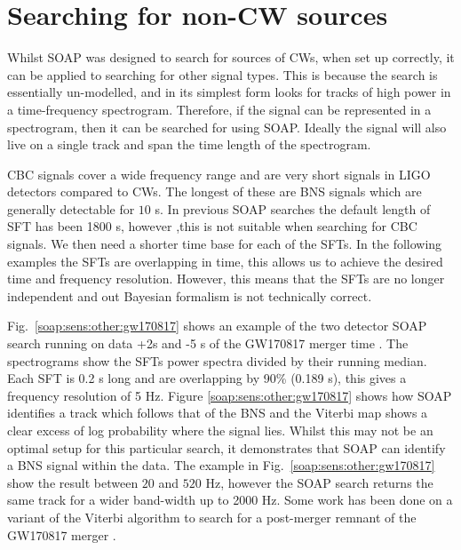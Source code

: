 \section{\label{soap:sens:other} Searching for non-CW sources}

Whilst SOAP was designed to search for sources of \glspl{CW}, when set up correctly, it can be applied to searching for other signal types.
This is because the search is essentially un-modelled, and in its simplest form looks for tracks of high power in a time-frequency spectrogram.
Therefore, if the signal can be represented in a spectrogram, then it can be
searched for using SOAP. 
Ideally the signal will also live on a single track and span the time length of the spectrogram. 

CBC signals cover a wide frequency range and are very short signals in \gls{LIGO} detectors compared to \glspl{CW}. 
The longest of these are \gls{BNS} signals which are generally detectable for $\mathcal{10}$
s. 
In previous SOAP searches the default length of \gls{SFT} has been 1800 s, however ,this is not suitable when searching for \gls{CBC} signals.
We then need a shorter time base for each of the \glspl{SFT}.
In the following examples the \glspl{SFT} are overlapping in time, this allows us to achieve the desired time and frequency resolution.
However, this means that the \glspl{SFT} are no longer independent and out Bayesian formalism is not technically correct.

Fig.~\ref{soap:sens:other:gw170817} shows an example of the two detector SOAP search running on data +2s and -5 s of the GW170817 merger time \citep{abbott2017GW170817Observation}. 
The spectrograms show the \glspl{SFT} power spectra divided by their
running median.
Each \gls{SFT} is 0.2 s long and are overlapping by 90\% (0.189 s), this gives a frequency resolution of 5 Hz. 
Figure \ref{soap:sens:other:gw170817} shows how SOAP identifies a track which
follows that of the \gls{BNS} and the Viterbi map shows a clear excess of log probability where the signal lies.
Whilst this may not be an optimal setup for this particular search, it demonstrates that SOAP can identify a \gls{BNS} signal within the data. 
The example in Fig.~\ref{soap:sens:other:gw170817} show the result between
$20$ and $520$ Hz, however the SOAP search returns the same track
for a wider band-width up to 2000 Hz.
Some work has been done on a variant of the Viterbi algorithm to search for a post-merger remnant of the GW170817 merger \citep{abbott2019SearchGravitational}.


